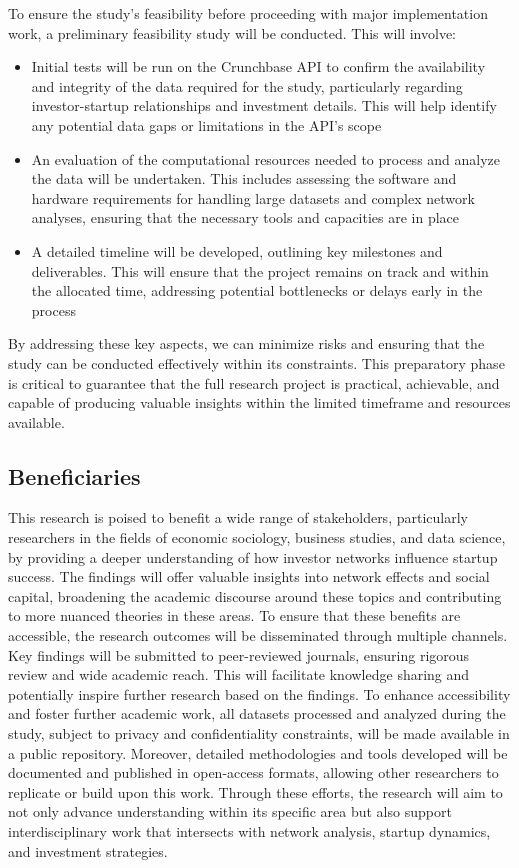 \documentclass[a4paper,11pt]{article}
\begin{document}
To ensure the study's feasibility before proceeding with major implementation work, a preliminary feasibility study will be conducted. This will involve:
\begin{itemize}
    \item Initial tests will be run on the Crunchbase API to confirm the availability and integrity of the data required for the study, particularly regarding investor-startup relationships and investment details. This will help identify any potential data gaps or limitations in the API's scope
    \item An evaluation of the computational resources needed to process and analyze the data will be undertaken. This includes assessing the software and hardware requirements for handling large datasets and complex network analyses, ensuring that the necessary tools and capacities are in place
    \item A detailed timeline will be developed, outlining key milestones and deliverables. This will ensure that the project remains on track and within the allocated time, addressing potential bottlenecks or delays early in the process
\end{itemize}

By addressing these key aspects, we can minimize risks and ensuring that the study can be conducted effectively within its constraints. This preparatory phase is critical to guarantee that the full research project is practical, achievable, and capable of producing valuable insights within the limited timeframe and resources available.

\subsection{Beneficiaries}

This research is poised to benefit a wide range of stakeholders, particularly researchers in the fields of economic sociology, business studies, and data science, by providing a deeper understanding of how investor networks influence startup success. The findings will offer valuable insights into network effects and social capital, broadening the academic discourse around these topics and contributing to more nuanced theories in these areas. To ensure that these benefits are accessible, the research outcomes will be disseminated through multiple channels. Key findings will be submitted to peer-reviewed journals, ensuring rigorous review and wide academic reach. This will facilitate knowledge sharing and potentially inspire further research based on the findings. To enhance accessibility and foster further academic work, all datasets processed and analyzed during the study, subject to privacy and confidentiality constraints, will be made available in a public repository. Moreover, detailed methodologies and tools developed will be documented and published in open-access formats, allowing other researchers to replicate or build upon this work. Through these efforts, the research will aim to not only advance understanding within its specific area but also support interdisciplinary work that intersects with network analysis, startup dynamics, and investment strategies.
\end{document}
